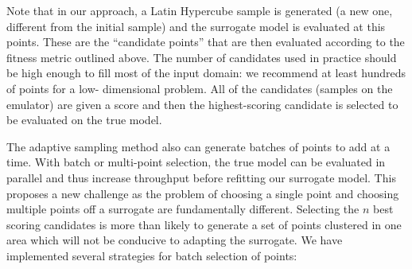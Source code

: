 Note that in our approach, a Latin Hypercube sample is generated (a new one, 
different from the initial sample) and the surrogate model is evaluated 
at this points. These are the ``candidate points'' that are then evaluated 
according to the fitness metric outlined above. The number of candidates used 
in practice should be high enough to fill most
of the input domain: we recommend at least hundreds of points for a low-
dimensional problem. 
All of the candidates (samples on the emulator) are 
given a score and then the highest-scoring candidate is selected to be evaluated
on the true model. 

The adaptive sampling method also can generate batches of points 
to add at a time. With batch or  multi-point 
selection, the true model can be evaluated in parallel and thus
increase throughput before refitting our surrogate model. This proposes a new
challenge as the problem of choosing a single point and choosing multiple points
off a surrogate are fundamentally different. Selecting the $n$ best scoring
candidates is more than likely to generate a set of points clustered in one
area which will not be conducive to adapting the surrogate.
We have implemented several strategies for batch selection of points: 
